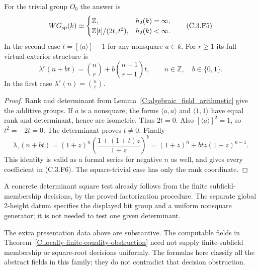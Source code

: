 \begin{corollary}
\label{C:algebraic_fields_scalar}
For the trivial group $O_0$ the answer is
\[
 WG_{\rm sp}(k)\simeq
 \begin{cases}
 \mathbb Z,&h_2(k)=\infty,\\
 \mathbb Z[t]/(2t,t^2),&h_2(k)<\infty.
 \end{cases}                                              \tag{C.3.F5}
\]
In the second case $t=[\langle a\rangle]-1$ for any nonsquare
$a\in k$. For $r\ge1$ its full virtual exterior structure is
\[
 \lambda^r(n+bt)=\binom nr+
       b\binom{n-1}{r-1}t,
       \qquad n\in\mathbb Z,\quad b\in\{0,1\}.            \tag{C.3.F6}
\]
In the first case $\lambda^r(n)=\binom nr$.
\end{corollary}
\begin{proof}
Rank and determinant from Lemma~\ref{C:algebraic_field_arithmetic}
give the additive groups. If $a$ is a nonsquare, the forms
$\langle a,a\rangle$ and $\langle1,1\rangle$ have equal rank
and determinant, hence are isometric. Thus $2t=0$.
Also $[\langle a\rangle]^2=1$, so $t^2=-2t=0$.
The determinant proves $t\ne0$. Finally
\[
 \lambda_z(n+bt)=(1+z)^n
       \left(\frac{1+(1+t)z}{1+z}\right)^b
       =(1+z)^n+b t z(1+z)^{n-1}.
\]
This identity is valid as a formal series for negative $n$
as well, and gives every coefficient in (C.3.F6).
The square-trivial case has only the rank coordinate.
\end{proof}

A concrete determinant square test already follows from the finite
subfield-membership decisions, by the proved factorization procedure.
The separate global 2-height datum specifies the displayed bit group
and a uniform nonsquare generator; it is not needed to test one
given determinant.

The extra presentation data above are substantive. The computable
fields in Theorem~\ref{C:locally-finite-equality-obstruction}
need not supply finite-subfield membership or square-root decisions
uniformly. The formulas here classify all the abstract fields in
this family; they do not contradict that decision obstruction.
